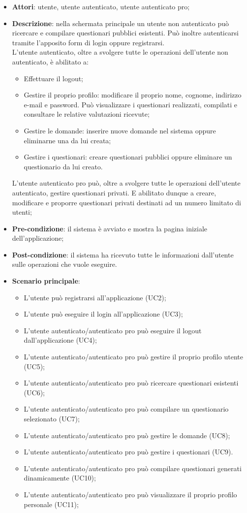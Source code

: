 \begin{itemize}
\item\textbf{Attori}: utente, utente autenticato, utente autenticato pro;
\item\textbf{Descrizione}: nella schermata principale un utente non autenticato può ricercare e compilare questionari pubblici esistenti. Può inoltre autenticarsi tramite l'apposito form di login oppure registrarsi.\\
L'utente autenticato, oltre a svolgere tutte le operazioni dell'utente non autenticato, è abilitato a:
\begin{itemize}
\item Effettuare il logout;
\item Gestire il proprio profilo: modificare il proprio nome, cognome, indirizzo e-mail e password. Può visualizzare i questionari realizzati, compilati e consultare le relative valutazioni ricevute;
\item Gestire le domande: inserire nuove domande nel sistema oppure eliminarne una da lui creata;
\item Gestire i questionari: creare questionari pubblici oppure eliminare un questionario da lui creato.
\end{itemize}

L'utente autenticato pro può, oltre a svolgere tutte le operazioni dell'utente autenticato, gestire questionari privati. E abilitato dunque a creare, modificare e proporre questionari privati destinati ad un numero limitato di utenti;
\item\textbf{Pre-condizione}: il sistema è avviato e mostra la pagina iniziale dell'applicazione;
\item\textbf{Post-condizione}: il sistema ha ricevuto tutte le informazioni dall'utente sulle operazioni che vuole eseguire.
\item\textbf{Scenario principale}:
\begin{itemize}
\item L'utente può registrarsi all'applicazione (UC2);
\item L'utente può eseguire il login all'applicazione (UC3);
\item L'utente autenticato/autenticato pro può eseguire il logout dall'applicazione (UC4); 
\item L'utente autenticato/autenticato pro può gestire il proprio profilo utente (UC5);
\item L'utente autenticato/autenticato pro può ricercare questionari esistenti (UC6);
\item L'utente autenticato/autenticato pro può compilare un questionario selezionato (UC7);
\item L'utente autenticato/autenticato pro può gestire le domande (UC8);
\item L'utente autenticato/autenticato pro può gestire i questionari (UC9).
\item L'utente autenticato/autenticato pro può compilare questionari generati dinamicamente (UC10);
\item L'utente autenticato/autenticato pro può visualizzare il proprio profilo personale (UC11);
\end{itemize}
\end{itemize}